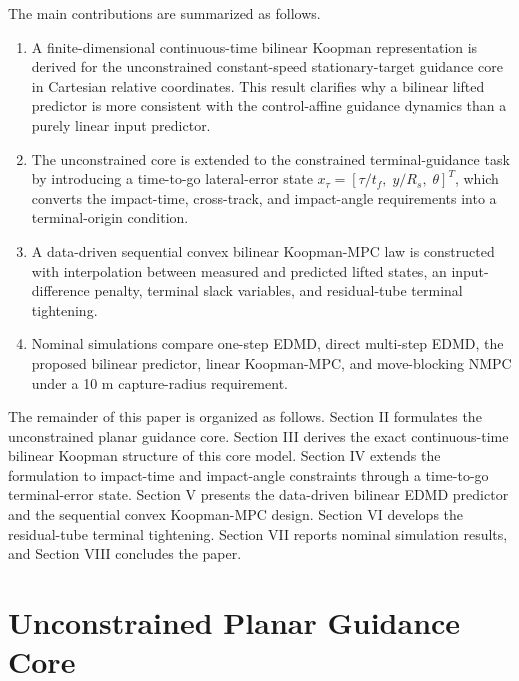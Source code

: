 \documentclass[letterpaper,journal]{IEEEtran}
\begin{document}
The main contributions are summarized as follows.
\begin{enumerate}
    \item A finite-dimensional continuous-time bilinear Koopman representation is derived for the unconstrained constant-speed stationary-target guidance core in Cartesian relative coordinates. This result clarifies why a bilinear lifted predictor is more consistent with the control-affine guidance dynamics than a purely linear input predictor.
    \item The unconstrained core is extended to the constrained terminal-guidance task by introducing a time-to-go lateral-error state $x_\tau=[\tau/t_f,\;y/R_s,\;\theta]^T$, which converts the impact-time, cross-track, and impact-angle requirements into a terminal-origin condition.
    \item A data-driven sequential convex bilinear Koopman-MPC law is constructed with interpolation between measured and predicted lifted states, an input-difference penalty, terminal slack variables, and residual-tube terminal tightening.
    \item Nominal simulations compare one-step EDMD, direct multi-step EDMD, the proposed bilinear predictor, linear Koopman-MPC, and move-blocking NMPC under a 10 m capture-radius requirement.
\end{enumerate}

The remainder of this paper is organized as follows. Section II formulates the unconstrained planar guidance core. Section III derives the exact continuous-time bilinear Koopman structure of this core model. Section IV extends the formulation to impact-time and impact-angle constraints through a time-to-go terminal-error state. Section V presents the data-driven bilinear EDMD predictor and the sequential convex Koopman-MPC design. Section VI develops the residual-tube terminal tightening. Section VII reports nominal simulation results, and Section VIII concludes the paper.

\section{Unconstrained Planar Guidance Core}
\end{document}
